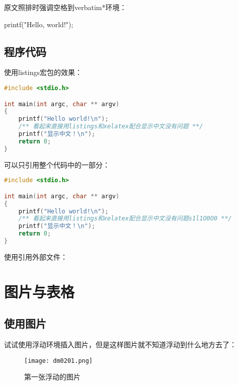 			原文照排时强调空格到verbatim*环境：
			\begin{verbatim*}
				printf("Hello, world!");
			\end{verbatim*}

		\subsection{程序代码}

			使用listings宏包的效果：

\begin{lstlisting}[language=C,label=lst:helloworld1, caption=Helloworld]
#include <stdio.h>

int main(int argc, char ** argv)
{
	printf("Hello world!\n");
	/** 看起来直接用listings和xelatex配合显示中文没有问题 **/
	printf("显示中文！\n");
	return 0;
}
\end{lstlisting}

			可以只引用整个代码中的一部分：

\begin{lstlisting}[language=C,firstline=3,lastline=9]
#include <stdio.h>

int main(int argc, char ** argv)
{
	printf("Hello world!\n");
	/** 看起来直接用listings和xelatex配合显示中文没有问题s1l1O0O0 **/
	printf("显示中文！\n");
	return 0;
}
\end{lstlisting}

			使用\verb||引用外部文件：

			

	\section{图片与表格}

		\subsection{使用图片}

			试试使用浮动环境插入图片，但是这样图片就不知道浮动到什么地方去了：

			\begin{figure}[htbp]                        %
				\centering                              %
				\texttt{[image: dm0201.png]} %
				\caption{第一张浮动的图片}            %
				\label{dm0201}                %
			\end{figure}


